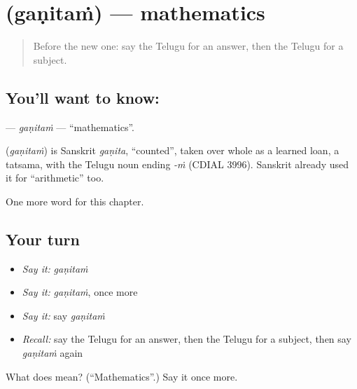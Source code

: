 \section[\texorpdfstring{\te{గణితం} (gaṇitaṁ)}{గణితం (gaṇitaṁ)}]{ (gaṇitaṁ) — mathematics}

\label{lesson:TE-C274-ganitam}



\begin{quote}
Before the new one: say the Telugu for an answer, then the Telugu for a subject.
\end{quote}

\subsection*{You'll want to know: }
\textbf{} — \emph{gaṇitaṁ} — \textquotedblleft{}mathematics\textquotedblright{}.

\begin{cousinweb}
\textbf{} (\emph{gaṇitaṁ}) is Sanskrit \emph{gaṇita}, \textquotedblleft{}counted\textquotedblright{}, taken over whole as a learned loan, a tatsama, with the Telugu noun ending \emph{-ṁ} (CDIAL 3996). Sanskrit already used it for \textquotedblleft{}arithmetic\textquotedblright{} too.
\end{cousinweb}

\begin{grammarlens}[title={What you've built}]
One more word for this chapter.
\end{grammarlens}

\subsection*{Your turn}
\begin{itemize}
\raggedright
  \item \emph{Say it:} \emph{gaṇitaṁ}
  \item \emph{Say it:} \emph{gaṇitaṁ}, once more
  \item \emph{Say it:} say \emph{gaṇitaṁ}
  \item \emph{Recall:} say the Telugu for an answer, then the Telugu for a subject, then say \emph{gaṇitaṁ} again
\end{itemize}

\begin{tcolorbox}[breakable,colback=teal!4,colframe=teal!35!black,title={Before you move on}]
What does  mean? (\textquotedblleft{}Mathematics\textquotedblright{}.) Say it once more.
\end{tcolorbox}
